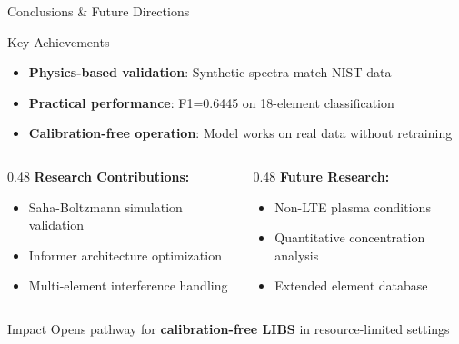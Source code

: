 \documentclass{beamer}
\begin{document}
\begin{frame}{Conclusions \& Future Directions}
  \begin{block}{Key Achievements}
    \begin{itemize}
      \item \textbf{Physics-based validation}: Synthetic spectra match NIST data
      \item \textbf{Practical performance}: F1=0.6445 on 18-element classification
      \item \textbf{Calibration-free operation}: Model works on real data without retraining
    \end{itemize}
  \end{block}
  
  \vspace{1em}
  
  \begin{columns}[T]
    \begin{column}{0.48\textwidth}
      \textbf{Research Contributions:}
      \begin{itemize}
        \item Saha-Boltzmann simulation validation
        \item Informer architecture optimization
        \item Multi-element interference handling
      \end{itemize}
    \end{column}
    \begin{column}{0.48\textwidth}
      \textbf{Future Research:}
      \begin{itemize}
        \item Non-LTE plasma conditions
        \item Quantitative concentration analysis  
        \item Extended element database
      \end{itemize}
    \end{column}
  \end{columns}
  
  \vspace{1em}
  \begin{alertblock}{Impact}
    Opens pathway for \textbf{calibration-free LIBS} in resource-limited settings
  \end{alertblock}
\end{frame}
\end{document}
